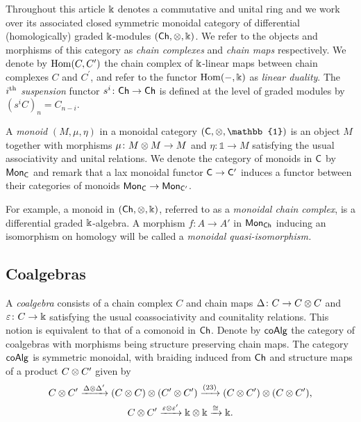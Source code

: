 Throughout this article $\Bbbk$ denotes a commutative and unital ring and we work over its associated closed symmetric monoidal category of differential (homologically) graded $\Bbbk$-modules $(\mathsf{Ch}, \otimes, \Bbbk)$.
We refer to the objects and morphisms of this category as \textit{chain complexes} and \textit{chain maps} respectively.
We denote by $\mathrm{Hom}(C, C^\prime)$ the chain complex of $\Bbbk$-linear maps between chain complexes $C$ and $C^\prime$, and refer to the functor $\mathrm{Hom}(-, \Bbbk)$ as \textit{linear duality}.
The $i^{\mathrm{th}}$ \textit{suspension} functor $s^i \colon \mathsf{Ch} \to \mathsf{Ch}$ is defined at the level of graded modules by $(s^{i}C)_n = C_{n-i}$.


A \textit{monoid} $(M, \mu, \eta)$ in a monoidal category $(\sC, \ot, \mathbb{1})$ is an object $M$ together with morphisms $\mu \colon M \otimes M \to M$ and $\eta \colon \mathbb{1} \to M$ satisfying the usual associativity and unital relations.
We denote the category of monoids in $\mathsf{C}$ by $\mathsf{Mon}_{\mathsf{C}}$ and remark that a lax monoidal functor $\mathsf{C} \to \mathsf{C}^\prime$ induces a functor between their categories of monoids $\mathsf{Mon}_{\mathsf{C}} \to \mathsf{Mon}_{\mathsf{C}^\prime}$.

For example, a monoid in $(\mathsf{Ch}, \otimes, \Bbbk)$, referred to as a \textit{monoidal chain complex}, is a differential graded $\Bbbk$-algebra.
A morphism $f: A \to A'$ in $\mathsf{Mon}_{\mathsf{Ch}}$ inducing an isomorphism on homology will be called a \textit{monoidal quasi-isomorphism.}

\subsection{Coalgebras}\label{ss:coalgebras}

A \textit{coalgebra} consists of a chain complex $C$ and chain maps $\Delta \colon C \to C \otimes C$ and $\varepsilon \colon C \to \Bbbk$ satisfying the usual coassociativity and counitality relations.
This notion is equivalent to that of a comonoid in $\mathsf{Ch}$.
Denote by $\mathsf{coAlg}$ the category of coalgebras with morphisms being structure preserving chain maps.
The category $\mathsf{coAlg}$ is symmetric monoidal, with braiding induced from $\mathsf{Ch}$ and structure maps of a product $C \otimes C^\prime$ given by
\begin{gather*}
	C \otimes C^\prime \xrightarrow{\Delta \otimes \Delta^\prime}
	(C \otimes C) \otimes (C^\prime \otimes C^\prime) \xrightarrow{(23)}
	(C \otimes C^\prime) \otimes (C \otimes C^\prime), \\
	C \otimes C^\prime \xrightarrow{\varepsilon \otimes \varepsilon^\prime}
	\Bbbk \otimes \Bbbk \xrightarrow{\cong} \Bbbk.
\end{gather*}

